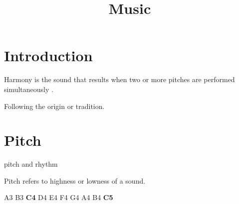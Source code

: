 \documentclass{blog}
\title{Music}
\begin{document}
\maketitle
\tableofcontents
\section{Introduction}
\begin{definition}[Harmony]
    Harmony is the sound that results when two or more pitches are performed simultaneously \cite{KOSTKA_2023_TONAL_HARMONY_WITH_AN_INTRODUCTION_TO_POST_TONAL_MUSIC}.
\end{definition}

Following the origin or tradition.

\section{Pitch}
\begin{definition}[note]
    pitch and rhythm
\end{definition}

\begin{definition}[pitch]
    Pitch refers to highness or lowness of a sound.
\end{definition}

\begin{definition}
    A3 B3 \textbf{C4} D4 E4 F4 G4 A4 B4 \textbf{C5}
\end{definition}

\printbibliography
\end{document}
